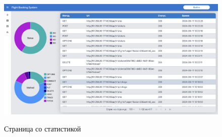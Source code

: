 \begin{figure}[H]
	\begin{center}
		{\includegraphics[scale = 0.25]{../img/pages/page-07.png}}
		\caption{Страница со статистикой}
		\label{fig:page-07}
	\end{center}
\end{figure}
